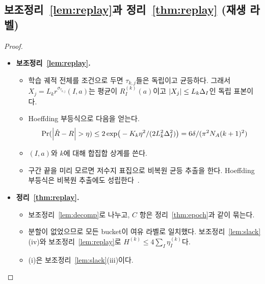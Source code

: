 \subsection{보조정리~\ref{lem:replay}과 정리~\ref{thm:replay} (재생 라벨)}
\begin{proof}\mbox{}
\begin{itemize}
  \item \textbf{보조정리~\ref{lem:replay}.}
    \begin{itemize}
      \item 학습 궤적 전체를 조건으로 두면 $\tau_{k,j}$들은 독립이고 균등하다. 그래서 $X_j=L_kr^{\sigma_{\tau_{k,j}}}(I,a)$는 평균이 $R_I^{(k)}(a)$이고 $\left\lvert X_j\right\rvert\le L_k\Delta_I$인 독립 표본이다.
      \item Hoeffding 부등식으로 다음을 얻는다.
        \[
        \Pr(\left\lvert \hat R-R\right\rvert>\eta)\le2\exp\!\big(-K_k\eta^2/(2L_k^2\Delta_I^2)\big)=6\delta/(\pi^2N_A(k+1)^2)
        \]
      \item $(I,a)$와 $k$에 대해 합집합 상계를 쓴다.
      \item 구간 끝을 미리 모르면 저수지 표집으로 비복원 균등 추출을 한다. Hoeffding 부등식은 비복원 추출에도 성립한다~\citep{hoeffding1963probability}.
    \end{itemize}
  \item \textbf{정리~\ref{thm:replay}.}
    \begin{itemize}
      \item 보조정리~\ref{lem:decomp}로 나누고, $C$ 항은 정리~\ref{thm:epoch}과 같이 묶는다.
      \item 분할이 없었으므로 모든 bucket이 여유 라벨로 일치했다. 보조정리~\ref{lem:slack}(iv)와 보조정리~\ref{lem:replay}로 $H^{(k)}\le4\sum_I\eta_I^{(k)}$다.
      \item (i)은 보조정리~\ref{lem:slack}(iii)이다.
    \end{itemize}
\end{itemize}
\end{proof}

